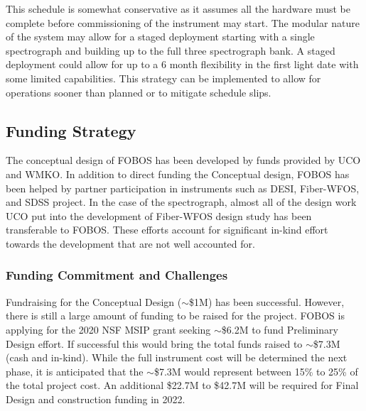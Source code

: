 \documentclass[oneside,11pt]{amsart}
\begin{document}
This schedule is somewhat conservative as it assumes all the hardware
must be complete before commissioning of the instrument may start.
The modular nature of the system may allow for a staged deployment
starting with a single spectrograph and building up to the full three
spectrograph bank. A staged deployment could allow for up to a 6
month flexibility in the first light date with some limited
capabilities. This strategy can be implemented to allow for
operations sooner than planned or to mitigate schedule slips.


\subsection{Funding Strategy}

The conceptual design of FOBOS has been developed by funds provided
by UCO and WMKO. In addition to direct funding the Conceptual design,
FOBOS has been helped by partner participation in instruments such as
DESI, Fiber-WFOS, and SDSS project. In the case of the spectrograph,
almost all of the design work UCO put into the development of
Fiber-WFOS design study has been transferable to FOBOS. These efforts
account for significant in-kind effort towards the development that
are not well accounted for.

\subsubsection{Funding Commitment and Challenges}

Fundraising for the Conceptual Design ($\sim$\$1M) has been
successful. However, there is still a large amount of funding to be
raised for the project. FOBOS is applying for the 2020 NSF MSIP grant
seeking $\sim$\$6.2M to fund Preliminary Design effort. If successful
this would bring the total funds raised to $\sim$\$7.3M (cash and
in-kind). While the full instrument cost will be determined the next
phase, it is anticipated that the $\sim$\$7.3M would represent
between 15\% to 25\% of the total project cost. An additional \$22.7M
to \$42.7M will be required for Final Design and construction funding
in 2022.
\end{document}
